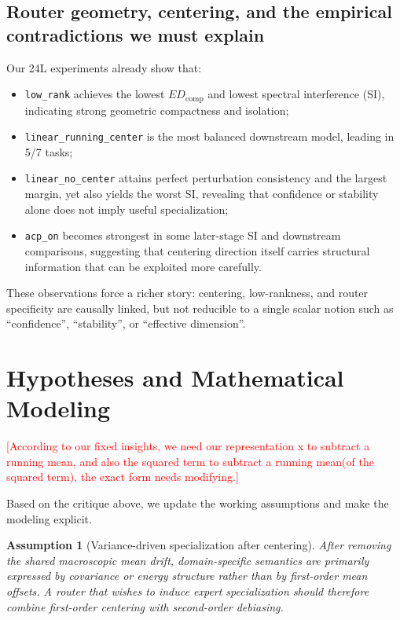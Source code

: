 \documentclass[11pt]{article}
\newcommand{\idea}[1]{\textcolor{red}{[#1]}}
\newtheorem{assumption}{Assumption}
\begin{document}
\subsection{Router geometry, centering, and the empirical contradictions we must explain}
Our 24L experiments already show that:
\begin{itemize}
    \item \texttt{low\_rank} achieves the lowest $ED_{\mathrm{comp}}$ and lowest spectral interference (SI), indicating strong geometric compactness and isolation;
    \item \texttt{linear\_running\_center} is the most balanced downstream model, leading in 5/7 tasks;
    \item \texttt{linear\_no\_center} attains perfect perturbation consistency and the largest margin, yet also yields the worst SI, revealing that confidence or stability alone does not imply useful specialization;
    \item \texttt{acp\_on} becomes strongest in some later-stage SI and downstream comparisons, suggesting that centering direction itself carries structural information that can be exploited more carefully.
\end{itemize}
These observations force a richer story: centering, low-rankness, and router specificity are causally linked, but not reducible to a single scalar notion such as ``confidence'', ``stability'', or ``effective dimension''.

\section{Hypotheses and Mathematical Modeling}

\idea{According to our fixed insights, we need our representation x to subtract a running mean, and also the squared term to subtract a running mean(of the squared term), the exact form needs modifying.}

Based on the critique above, we update the working assumptions and make the modeling explicit.

\begin{assumption}[Variance-driven specialization after centering]
After removing the shared macroscopic mean drift, domain-specific semantics are primarily expressed by covariance or energy structure rather than by first-order mean offsets. A router that wishes to induce expert specialization should therefore combine first-order centering with second-order debiasing.
\end{assumption}
\end{document}
